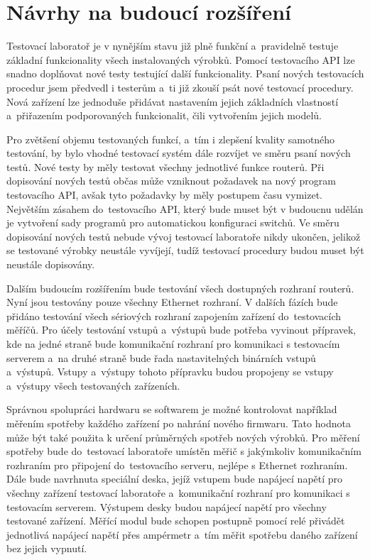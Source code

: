 \chapter{Návrhy na budoucí rozšíření}
Testovací laboratoř je v nynějším stavu již plně funkční a~pravidelně testuje základní funkcionality všech instalovaných výrobků. Pomocí testovacího API lze snadno doplňovat nové testy testující další funkcionality. Psaní nových testovacích procedur jsem předvedl i testerům a~ti již zkouší psát nové testovací procedury. Nová zařízení lze jednoduše přidávat nastavením jejich základních vlastností a~přiřazením podporovaných funkcionalit, čili vytvořením jejich modelů.

Pro zvětšení objemu testovaných funkcí, a~tím i zlepšení kvality samotného testování, by bylo vhodné testovací systém dále rozvíjet ve směru psaní nových testů. Nové testy by měly testovat všechny jednotlivé funkce routerů. Při dopisování nových testů občas může vzniknout požadavek na nový program testovacího API, avšak tyto požadavky by měly postupem času vymizet. Největším zásahem do~testovacího API, který bude muset být v budoucnu udělán je vytvoření sady programů pro automatickou konfiguraci switchů. Ve směru dopisování nových testů nebude vývoj testovací laboratoře nikdy ukončen, jelikož se testované výrobky neustále vyvíjejí, tudíž testovací procedury budou muset být neustále dopisovány.

Dalším budoucím rozšířením bude testování všech dostupných rozhraní routerů. Nyní jsou testovány pouze všechny Ethernet rozhraní. V dalších fázích bude přidáno testování všech sériových rozhraní zapojením zařízení do~testovacích měříčů. Pro účely testování vstupů a~výstupů bude potřeba vyvinout přípravek, kde na jedné straně bude komunikační rozhraní pro komunikaci s testovacím serverem a~na druhé straně bude řada nastavitelných binárních vstupů a~výstupů. Vstupy a~výstupy tohoto přípravku budou propojeny se vstupy a~výstupy všech testovaných zařízeních.

Správnou spolupráci hardwaru se softwarem je možné kontrolovat například měřením spotřeby každého zařízení po nahrání nového firmwaru. Tato hodnota může být také použita k určení průměrných spotřeb nových výrobků. Pro měření spotřeby bude do~testovací laboratoře umístěn měřič s jakýmkoliv komunikačním rozhraním pro připojení do~testovacího serveru, nejlépe s Ethernet rozhraním. Dále bude navrhnuta speciální deska, jejíž vstupem bude napájecí napětí pro všechny zařízení testovací laboratoře a~komunikační rozhraní pro komunikaci s testovacím serverem. Výstupem desky budou napájecí napětí pro všechny testované zařízení. Měřící modul bude schopen postupně pomocí relé přivádět jednotlivá napájecí napětí přes ampérmetr a~tím měřit spotřebu daného zařízení bez jejich vypnutí.

\endinput
